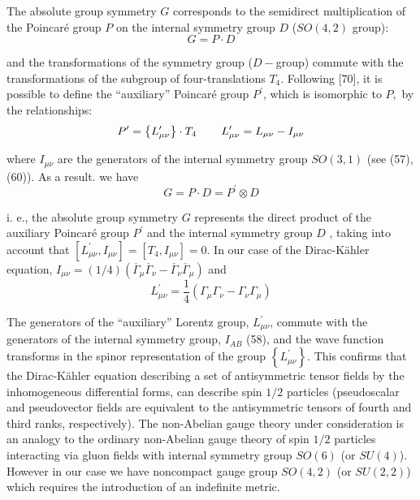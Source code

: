 \documentclass[a4paper,12pt]{article}
\begin{document}
The absolute group symmetry $G$ corresponds to the semidirect multiplication
of the Poincar\'e group $P$ on the internal symmetry group $D$ ($SO(4,2)$
group):
\begin{equation}
G=P\cdot D  \label{110}
\end{equation}

and the transformations of the symmetry group ($D-$group) commute with the
transformations of the subgroup of four-translations $T_4$. Following [70],
it is possible to define the ``auxiliary'' Poincar\'e group $P^{\prime }$,
which is isomorphic to $P,$ by the relationships:
\begin{equation}
P^{\prime }=\left\{ L_{\mu \nu }^{\prime }\right\} \cdot
T_4\hspace{0.3in} L_{\mu \nu }^{\prime }=L_{\mu \nu }-I_{\mu \nu }
\label{111}
\end{equation}

where $I_{\mu \nu }$ are the generators of the internal symmetry group $%
SO(3,1)$ (see (57), (60)). As a result. we have
\begin{equation}
G=P\cdot D=P^{\prime }\otimes D  \label{112}
\end{equation}

i. e., the absolute group symmetry $G$ represents the direct
product of the auxiliary Poincar\'e group $P^{\prime }$ and the
internal symmetry group $D$ , taking into account that $\left[
L_{\mu \nu }^{\prime },I_{\mu \nu }\right] =\left[ T_4,I_{\mu \nu
}\right] =0$. In our case of the Dirac-K\"ahler equation, $I_{\mu
\nu }=(1/4)(\overline{\Gamma }_\mu \overline{\Gamma }_\nu
-\overline{\Gamma }_\nu \overline{\Gamma }_\mu )$ and
\begin{equation}
L_{\mu \nu }^{\prime }=\frac 14\left( \Gamma _\mu \Gamma _\nu -\Gamma _\nu
\Gamma _\mu \right)  \label{113}
\end{equation}

The generators of the ``auxiliary'' Lorentz group, $L_{\mu \nu
}^{\prime }$, commute with the generators of the internal symmetry
group, $I_{AB}$ (58), and the wave function transforms in the
spinor representation of the group $ \left\{ L_{\mu \nu }^{\prime
}\right\} $. This confirms that the Dirac-K\"ahler equation
describing a set of antisymmetric tensor fields by the
inhomogeneous differential forms, can describe spin $1/2$
particles (pseudoscalar and pseudovector fields are equivalent to
the antisymmetric tensors of fourth and third ranks,
respectively). The non-Abelian gauge theory under consideration is
an analogy to the ordinary non-Abelian gauge theory of spin $1/2$
particles interacting via gluon fields with internal symmetry
group $SO(6)$ (or $SU(4)$). However in our case we have noncompact
gauge group $SO(4,2)$ (or $SU(2,2)$) which requires the
introduction of an indefinite metric.
\end{document}
